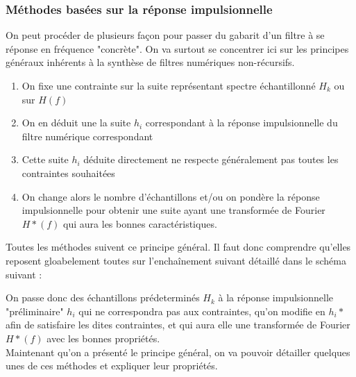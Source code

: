 \documentclass[11pt,a4paper]{article}
\begin{document}
\subsubsection{Méthodes basées sur la réponse impulsionnelle}
On peut procéder de plusieurs façon pour passer du gabarit d'un filtre à se réponse en fréquence "concrète". On va surtout se concentrer ici sur les principes généraux inhérents à la synthèse de filtres numériques non-récursifs.

\begin{enumerate}
\item On fixe une contrainte sur la suite  représentant spectre échantillonné $H_k$ ou sur $H(f)$ 
\item On en déduit une la suite  $h_i$ correspondant à la réponse impulsionnelle du filtre numérique correspondant
\item Cette suite $h_i$ déduite directement ne respecte généralement pas toutes les contraintes souhaitées 
\item On change alors le nombre d'échantillons  et/ou on pondère la réponse impulsionnelle pour obtenir une suite ayant une transformée de Fourier $H*(f)$ qui aura les bonnes caractéristiques.
\end{enumerate}

Toutes les méthodes suivent ce principe général. Il faut donc comprendre qu'elles reposent gloabelement toutes sur l'enchaînement suivant détaillé dans le schéma suivant :

\begin{center}
\end{center}
On passe donc des échantillons  prédeterminés $H_k$ à la réponse impulsionnelle "préliminaire" $h_i$ qui ne correspondra pas aux contraintes, qu'on modifie en $h_i*$ afin de satisfaire les dites contraintes, et qui aura elle une transformée de Fourier $H*(f)$ avec les bonnes propriétés.\\

Maintenant qu'on a présenté le principe général, on va pouvoir détailler quelques unes de ces méthodes et expliquer leur propriétés.
\end{document}
